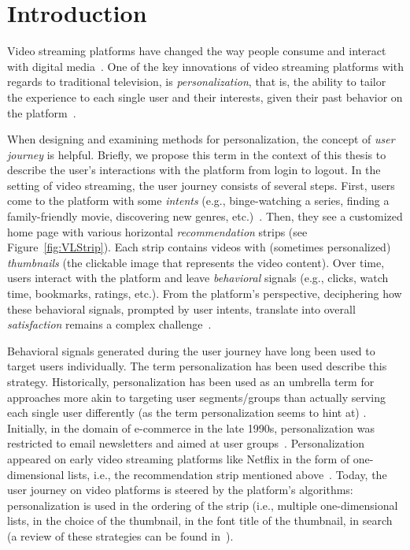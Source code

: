 
\chapter{Introduction}
\label{chapter:introduction}


Video streaming platforms have changed the way people consume and interact with digital media~\cite{NetflixReco}. 
One of the key innovations of video streaming platforms with regards to traditional television, is \emph{personalization}, that is, the ability to tailor the experience to each single user and their interests, given their past behavior on the platform~\cite{oldPersonalizationBehavior, oldPersonalizationSearch}. 

When designing and examining methods for personalization, the concept of \emph{user journey} is helpful. 
Briefly, we propose this term in the context of this thesis to describe the user's interactions with the platform from login to logout.
In the setting of video streaming, the user journey consists of several steps.
First, users come to the platform with some \emph{intents} (e.g., binge-watching a series, finding a family-friendly movie, discovering new genres, etc.)~\cite{intent}. 
Then, they see a customized home page with various horizontal \emph{recommendation} strips (see Figure~\ref{fig:VLStrip}). 
Each strip contains videos with (sometimes personalized) \emph{thumbnails} (the clickable image that represents the video content). 
Over time, users interact with the platform and leave \emph{behavioral} signals (e.g., clicks, watch time, bookmarks, ratings, etc.). 
From the platform's perspective, deciphering how these behavioral signals, prompted by user intents, translate into overall \emph{satisfaction} remains a complex challenge~\cite{spotifyIntent}.

Behavioral signals generated during the user journey have long been used to target users individually. 
The term personalization has been used describe this strategy. 
Historically, personalization has been used as an umbrella term for approaches more akin to targeting user segments/groups than actually serving each single user differently (as the term personalization seems to hint at) . 
Initially, in the domain of e-commerce in the late 1990s, personalization was restricted to email newsletters and aimed at user groups~\cite{oldReco}. 
Personalization appeared on early video streaming platforms like Netflix in the form of one-dimensional lists, i.e.,  the recommendation strip mentioned above~\cite{oldReco}. 
Today, the user journey on video platforms is steered by the platform's algorithms: personalization is used in the ordering of the strip (i.e., multiple one-dimensional lists, in the choice of the thumbnail, in the font title of the thumbnail, in search (a review of these strategies can be found in~\cite{NetflixReco}).


